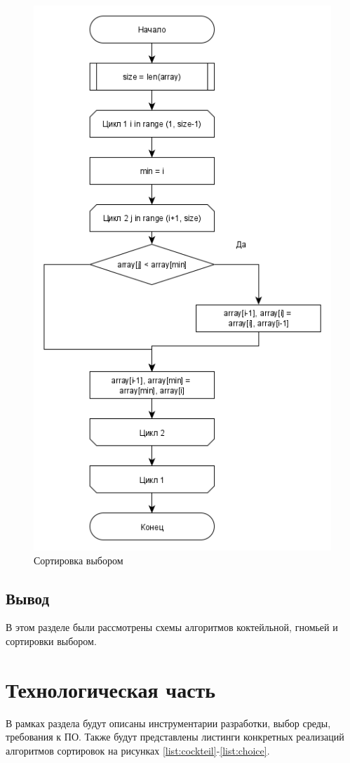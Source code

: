 \documentclass[a4paper,12pt]{report}
\begin{document}
    	\newpage
    
    	\begin{figure}[h!]
    		\centering
    		\includegraphics[width=0.65\linewidth]{choice_sort1.png}
    		\caption{Сортировка выбором}
    		\label{ris:choice}
    	\end{figure}
    
    \section{Вывод}
   
    		В этом разделе были рассмотрены схемы алгоритмов коктейльной, гномьей и сортировки выбором.

    \newpage

    \chapter{Технологическая часть}
        \label{sec:tecnologic_part}

        	В рамках раздела будут описаны инструментарии разработки, выбор среды, требования к ПО. 
        	Также будут представлены листинги конкретных реализаций алгоритмов сортировок на рисунках \ref{list:cockteil}-\ref{list:choice}.
        	
\end{document}
